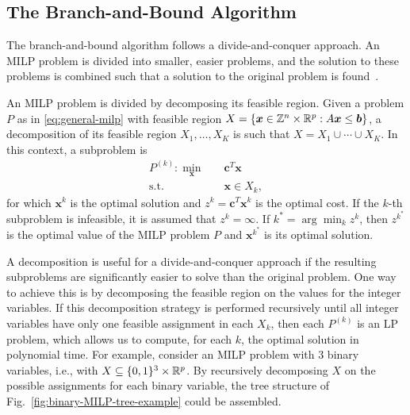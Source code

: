 \subsection{The Branch-and-Bound Algorithm}

The branch-and-bound algorithm follows a divide-and-conquer approach.
An MILP problem is divided into smaller, easier problems, and the solution to these problems is combined such that a solution to the original problem is found~\cite{wolseyIntegerProgramming1998}.

An MILP problem is divided by decomposing its feasible region.
Given a problem $P$ as in \eqref{eq:general-milp} with feasible region $X=\{\bm{x}\in \mathbb{Z}^{n}\times \mathbb{R}^{p}: A\bm{x}\le \bm{b}\}$, a decomposition of its feasible region $X_1,\ldots,X_K$ is such that $X=X_1\cup \cdots\cup X_K$.
In this context, a subproblem is
\begin{equation}\label{eq:milp-subproblem}
\begin{split}
    P^{(k)} : \min_{\bm{x}} \quad & \bm{c}^{T}\bm{x} \\
    \textrm{s.t.} \quad & \bm{x}\in X_k
,\end{split}
\end{equation}
for which $\bm{x}^{k}$ is the optimal solution and $z^{k}=\bm{c}^{T}\bm{x}^{k}$ is the optimal cost.
If the $k$-th subproblem is infeasible, it is assumed that $z^{k}=\infty$.
If $k^{*}= \arg\min_k z^{k}$, then $z^{k^*}$ is the optimal value of the MILP problem $P$ and $\bm{x}^{k^*}$ is its optimal solution.

A decomposition is useful for a divide-and-conquer approach if the resulting subproblems are significantly easier to solve than the original problem.
One way to achieve this is by decomposing the feasible region on the values for the integer variables.
If this decomposition strategy is performed recursively until all integer variables have only one feasible assignment in each $X_k$, then each $P^{(k)}$ is an LP problem, which allows us to compute, for each $k$, the optimal solution in polynomial time.
For example, consider an MILP problem with 3 binary variables, i.e., with $X\subseteq \{0,1\}^{3}\times \mathbb{R}^{p}$.
By recursively decomposing $X$ on the possible assignments for each binary variable, the tree structure of Fig.~\ref{fig:binary-MILP-tree-example} could be assembled.

